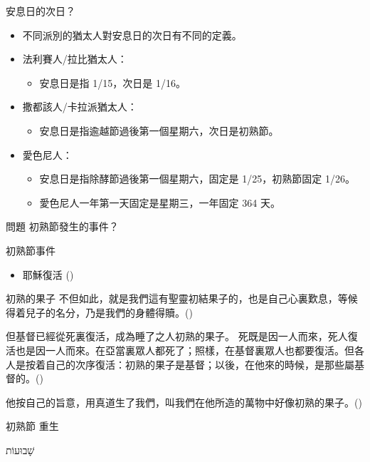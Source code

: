 \documentclass{beamer}
\newcommand{\topic}[1]{
  \begin{frame}
    \centering
    \vspace*{1cm}
    {\fontsize{40}{48}\selectfont #1\par}
    \vfill
  \end{frame}
}
\newcommand{\question}[1]{
  \begin{frame}{問題}
    \centering
    \vspace*{1cm}
    \huge #1？\par
    \vfill
  \end{frame}
}
\newcommand{\conclusion}[2]{
  \begin{frame}
    \centering
    \vspace*{1cm}
    {\fontsize{40}{48}\selectfont #1 \textemdash #2\par}
    \vfill
  \end{frame}
}
\newcommand{\parvspace}{\par\vspace{0.5em}}
\begin{document}
\begin{frame}{安息日的次日？}
  \begin{itemize}
    \item 不同派別的猶太人對安息日的次日有不同的定義。\parencite{TruthShavuot}
    \item 法利賽人/拉比猶太人：
      \begin{itemize}
        \item 安息日是指 1/15，次日是 1/16。
      \end{itemize}
    \item 撒都該人/卡拉派猶太人：
      \begin{itemize}
        \item 安息日是指逾越節過後第一個星期六，次日是初熟節。
      \end{itemize}
    \item 愛色尼人：
      \begin{itemize}
        \item 安息日是指除酵節過後第一個星期六，固定是 1/25，初熟節固定 1/26。
        \item 愛色尼人一年第一天固定是星期三，一年固定 364 天。
      \end{itemize}
  \end{itemize}
\end{frame}

\question{初熟節發生的事件}

\begin{frame}{初熟節事件}
  \begin{itemize}
    \item 耶穌復活 ()
  \end{itemize}
\end{frame}

\begin{frame}{初熟的果子}
  不但如此，就是我們這有聖靈\alert{初結果子}的，也是自己心裏歎息，等候得着兒子的名分，乃是我們的身體得贖。()\parvspace
  但基督已經從死裏復活，成為\alert{睡了之人初熟的果子}。 死既是因一人而來，死人復活也是因一人而來。在亞當裏眾人都死了；照樣，在基督裏眾人也都要復活。但各人是按着自己的次序復活：\alert{初熟的果子是基督}；以後，在他來的時候，是那些屬基督的。()\parvspace
  他按自己的旨意，用真道生了我們，叫我們在他所造的萬物中好像\alert{初熟的果子}。()\parvspace
\end{frame}

\conclusion{初熟節}{重生}

\topic{\texthebrew{שָׁבוּעוֹת}}
\end{document}
